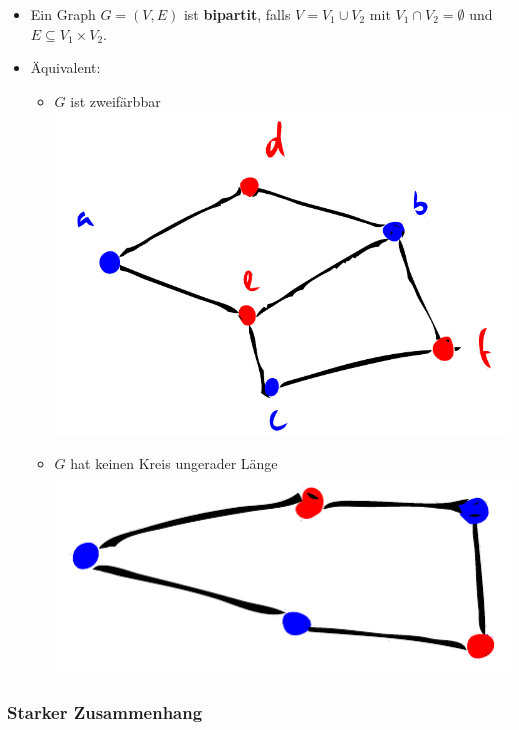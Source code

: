 \documentclass{scrartcl}
\begin{document}
\begin{itemize}
	\item Ein Graph $ G = (V,E) $ ist \textbf{bipartit}, falls $ V = V_1 \cup V_2 $ mit $ V_1 \cap V_2 = \emptyset $ und $ E \subseteq V_1 \times V_2 $.
	\item Äquivalent:
	\begin{itemize}
		\item $ G $ ist zweifärbbar \\
		\includegraphics{figures/zweifaerbbar.pdf}
		\item $ G $ hat keinen Kreis ungerader Länge \\
		\includegraphics[width=\linewidth]{figures/kreis-ungerader-laenge.pdf}
	\end{itemize}
\end{itemize}

\subsubsection{Starker Zusammenhang}
\end{document}
